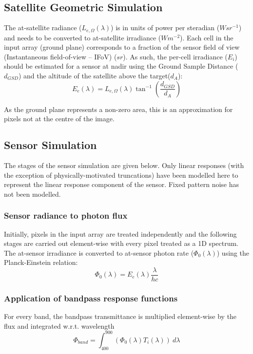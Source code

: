 \documentclass[10pt,a4paper,final,twocolumn]{article}
\begin{document}
\subsection{Satellite Geometric Simulation}
The at-satellite radiance ($L_{e,\Omega}(\lambda)$) is in units of power per steradian ($W sr^{-1}$) and needs to be converted to at-satellite irradiance ($W m^{-2}$). Each cell in the input array (ground plane) corresponds to a fraction of the sensor field of view (Instantaneous field-of-view -- IFoV) ($sr$). As such, the per-cell irradiance ($E_i$) should be estimated for a sensor at nadir using the Ground Sample Distance ($d_{GSD}$) and the altitude of the satellite above the target($d_{A}$):
\begin{equation}
E_e(\lambda) = L_{e,\Omega}(\lambda) \tan^{-1} \left(\frac{d_{GSD}}{d_A}\right)
\end{equation}

As the ground plane represents a non-zero area, this is an approximation for pixels not at the centre of the image.

\subsection{Sensor Simulation}
The stages of the sensor simulation are given below. Only linear responses (with the exception of physically-motivated truncations) have been modelled here to represent the linear response component of the sensor. Fixed pattern noise has not been modelled.

\subsubsection{Sensor radiance to photon flux}
Initially, pixels in the input array are treated independently and the following stages are carried out element-wise with every pixel treated as a 1D spectrum. The at-sensor irradiance is converted to at-sensor photon rate ($\Phi_{0}(\lambda) $) using the Planck-Einstein relation:
\begin{equation}
\Phi_{0}(\lambda) = E_e(\lambda)\frac{\lambda}{hc}
\end{equation}


\subsubsection{Application of bandpass response functions}
For every band, the bandpass transmittance is multiplied element-wise by the flux and integrated w.r.t. wavelength
\begin{equation}
\Phi_{band}= \int_{400}^{900}(\Phi_0(\lambda)T_i(\lambda))~d\lambda
\end{equation}
\end{document}

